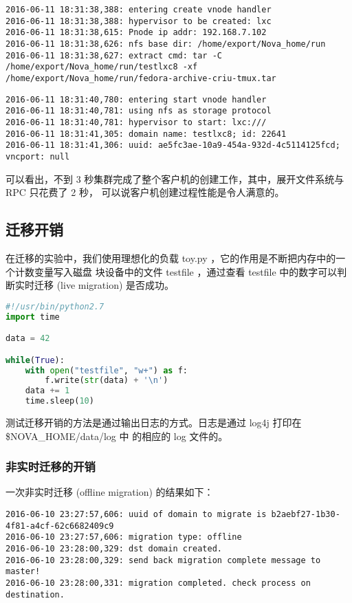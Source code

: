 \begin{lstlisting}
2016-06-11 18:31:38,388: entering create vnode handler
2016-06-11 18:31:38,388: hypervisor to be created: lxc
2016-06-11 18:31:38,615: Pnode ip addr: 192.168.7.102
2016-06-11 18:31:38,626: nfs base dir: /home/export/Nova_home/run
2016-06-11 18:31:38,627: extract cmd: tar -C /home/export/Nova_home/run/testlxc8 -xf /home/export/Nova_home/run/fedora-archive-criu-tmux.tar
\end{lstlisting}

\begin{lstlisting}
2016-06-11 18:31:40,780: entering start vnode handler
2016-06-11 18:31:40,781: using nfs as storage protocol
2016-06-11 18:31:40,781: hypervisor to start: lxc:///
2016-06-11 18:31:41,305: domain name: testlxc8; id: 22641
2016-06-11 18:31:41,306: uuid: ae5fc3ae-10a9-454a-932d-4c5114125fcd; vncport: null
\end{lstlisting}

可以看出，不到 3 秒集群完成了整个客户机的创建工作，其中，展开文件系统与 RPC 只花费了 2 秒，
可以说客户机创建过程性能是令人满意的。

\subsection{迁移开销}

在迁移的实验中，我们使用理想化的负载 toy.py ，它的作用是不断把内存中的一个计数变量写入磁盘
块设备中的文件 testfile ，通过查看 testfile 中的数字可以判断实时迁移 (live migration)
是否成功。

\begin{lstlisting}[language=Python]
#!/usr/bin/python2.7
import time

data = 42

while(True):
    with open("testfile", "w+") as f:
        f.write(str(data) + '\n')
    data += 1
    time.sleep(10)
\end{lstlisting}

测试迁移开销的方法是通过输出日志的方式。日志是通过 log4j 打印在 \$NOVA\_HOME/data/log 中
的相应的 log 文件的。

\subsubsection{非实时迁移的开销}

一次非实时迁移 (offline migration) 的结果如下：

\begin{lstlisting}
2016-06-10 23:27:57,606: uuid of domain to migrate is b2aebf27-1b30-4f81-a4cf-62c6682409c9
2016-06-10 23:27:57,606: migration type: offline
2016-06-10 23:28:00,329: dst domain created.
2016-06-10 23:28:00,329: send back migration complete message to master!
2016-06-10 23:28:00,331: migration completed. check process on destination.
\end{lstlisting}

